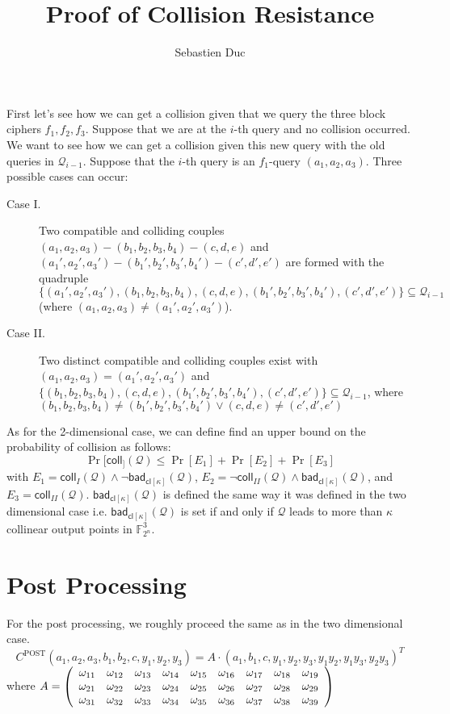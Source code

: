 \documentclass[12pt,a4paper]{article}
\title{Proof of Collision Resistance}
\author{Sebastien Duc}
\date{}
\newcommand{\coll}[1]{\mathsf{coll}_{#1}(\mathcal{Q})}
\newcommand{\badcl}{\mathsf{bad}_{\mathsf{cl}[\kappa]}(\mathcal{Q})}
\begin{document}
\maketitle
First let's see how we can get a collision given that we query the three block ciphers $f_1,f_2,f_3$.
Suppose that we are at the $i$-th query and no collision occurred. 
We want to see how we can get a collision given this new query with the old queries in $\mathcal{Q}_{i-1}$.
Suppose that the $i$-th query is an $f_1$-query $(a_1,a_2,a_3)$. Three possible cases can occur:
\begin{description}
    \item[Case I.] Two compatible and colliding couples $(a_1,a_2,a_3)-(b_1,b_2,b_3,b_4)-(c,d,e)$ and 
        $(a_1',a_2',a_3')-(b_1',b_2',b_3',b_4')-(c',d',e')$ are formed with the quadruple 
        $\{(a_1',a_2',a_3'),(b_1,b_2,b_3,b_4),(c,d,e),(b_1',b_2',b_3',b_4'),(c',d',e')\} \subseteq \mathcal{Q}_{i-1}$ (where $(a_1,a_2,a_3) \neq (a_1',a_2',a_3')$).
    \item[Case II.] Two distinct compatible and colliding couples exist with $(a_1,a_2,a_3) = (a_1',a_2',a_3')$ and 
        $\{(b_1,b_2,b_3,b_4),(c,d,e),(b_1',b_2',b_3',b_4'),(c',d',e')\} \subseteq \mathcal{Q}_{i-1}$, where $(b_1,b_2,b_3,b_4)\neq(b_1',b_2',b_3',b_4')\lor (c,d,e)\neq(c',d',e')$
\end{description}
As for the 2-dimensional case, we can define find an upper bound on the probability of collision as follows:
\[
    \Pr[\coll] \leq \Pr[E_1] + \Pr[E_2] + \Pr[E_3]
\]
with $E_1 = \coll{I} \land \lnot \badcl$, $E_2 = \lnot\coll{II} \land \badcl$, and $E_3 = \coll{II}$.
$\badcl$ is defined the same way it was defined in the two dimensional case i.e. $\badcl$ is set if and only if $\mathcal{Q}$ leads to more than $\kappa$ collinear output points in
$\mathbb{F}_{2^n}^3$.

\section*{Post Processing}
For the post processing, we roughly proceed the same as in the two dimensional case.
\[
    C^{\mathrm{POST}}(a_1,a_2,a_3,b_1,b_2,c,y_1,y_2,y_3) = A \cdot (a_1 , b_1 , c , y_1 , y_2 , y_3 , y_1y_2 , y_1y_3 , y_2y_3)^T
\]
where $A = 
\left(\begin{array}{l l l l l l l l l} 
    \omega_{11} & \omega_{12} & \omega_{13} & \omega_{14} & \omega_{15} & \omega_{16} & \omega_{17} & \omega_{18} & \omega_{19} \\
    \omega_{21} & \omega_{22} & \omega_{23} & \omega_{24} & \omega_{25} & \omega_{26} & \omega_{27} & \omega_{28} & \omega_{29} \\
    \omega_{31} & \omega_{32} & \omega_{33} & \omega_{34} & \omega_{35} & \omega_{36} & \omega_{37} & \omega_{38} & \omega_{39} \\
\end{array}\right)
$
\vskip 9pt
\end{document}
